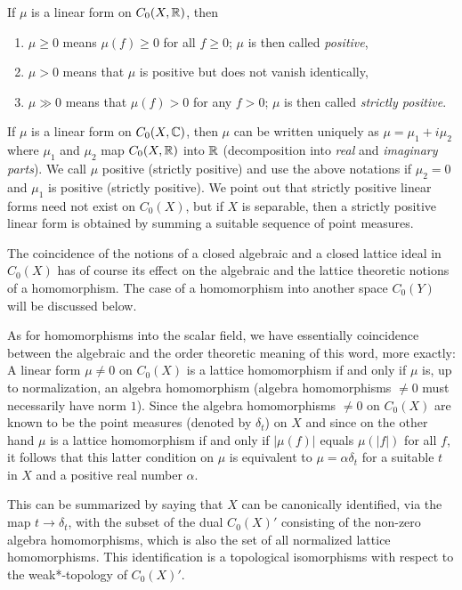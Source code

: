 If $\mu$ is a linear form on $C_{0}(X,\mathbb{R})$, then
\begin{enumerate}[label=]

\item
$\mu \geq 0$ means  $ \mu(f) \geq 0 $ for all $ f \geq 0 $;  $ \mu $ is then called \emph{positive},

\item
$ \mu > 0 $ means that $ \mu $ is positive but does not vanish identically,

\item
$ \mu \gg 0 $ means that $ \mu(f) > 0 $ for any $ f > 0 $;  $ \mu $ is then called \emph{strictly positive}.

\end{enumerate}
If $\mu$ is a linear form on $C_{0}(X,\mathbb{C})$, then $\mu$ can be written uniquely as $\mu = \mu_{1} + i\mu_{2}$ where $\mu_{1}$ and $\mu_{2}$ map $C_{0}(X,\mathbb{R})$ into $\mathbb{R}$ (decomposition into \emph{real} and \emph{imaginary parts}).
We call $\mu$ positive (strictly positive) and use the above notations if $\mu_{2} = 0$ and $\mu_{1}$ is positive (strictly positive).
We point out that strictly positive linear forms need not exist on $C_{0}(X)$, but if $X$ is separable, then a strictly positive linear form is obtained by summing a suitable sequence of point measures.

The coincidence of the notions of a closed algebraic and a closed lattice ideal in $C_{0}(X)$ has of course its effect on the algebraic and the lattice theoretic notions of a homomorphism.
The case of a homomorphism into another space $C_{0}(Y)$ will be discussed below.

As for homomorphisms into the scalar field, we have essentially coincidence between the algebraic and the order theoretic meaning of this word, more exactly: A linear form $\mu \neq 0$ on $C_{0}(X)$ is a lattice homomorphism if and only if $\mu$ is, up to normalization, an algebra homomorphism (algebra homomorphisms $\neq 0$ must necessarily have norm $1$).
Since the algebra homomorphisms $\neq 0$ on $C_{0}(X)$ are known to be the point measures (denoted by $\delta_{t}$) on $X$ and since on the other hand $\mu$ is a lattice homomorphism if and only if $|\mu(f)|$ equals $\mu(|f|)$ for all $f$, it follows that this latter condition on $\mu$ is equivalent to $\mu = \alpha\delta_{t}$ for a suitable $t$ in $X$ and a positive real number $\alpha$.

This can be summarized by saying that $X$ can be canonically identified, via the map $t \to \delta_{t}$, with the subset of the dual $C_{0}(X)'$ consisting of the non-zero algebra homomorphisms, which is also the set of all normalized lattice homomorphisms.
This identification is a topological isomorphisms with respect to the weak*-topology of $ C_{0}(X)' $.
